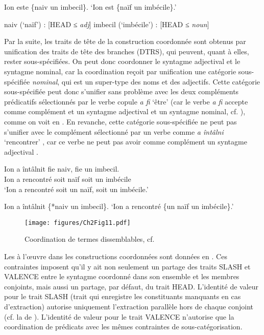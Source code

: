 \ex Ion este \{naiv {\textbar} un imbecil\}.
\glt ‘Ion est \{naïf {\textbar} un imbécile\}.’  
\z
\z


\ea \label{ch2:ex256}
\ea naiv (‘naïf’) : [HEAD  {\textbar}  ≤ \textit{adj}] \label{ch2:ex256a}
\ex imbecil (‘imbécile’) : [HEAD  {\textbar}  ≤ \textit{noun}] \label{ch2:ex256b}
\z
\z

Par la suite, les traits de tête de la construction coordonnée sont obtenus par unification des traits de tête des branches (DTRS), qui peuvent, quant à elles, rester sous-spécifiées. On peut donc coordonner le syntagme adjectival et le syntagme nominal, car la coordination reçoit par unification une catégorie sous-spécifiée \textit{nominal}, qui est un super-type des noms et des adjectifs. Cette catégorie sous-spécifiée peut donc s’unifier sans problème avec les deux compléments prédicatifs sélectionnés par le verbe copule \textit{a fi} ‘être’ (car le verbe \textit{a fi} accepte comme complément et un syntagme adjectival et un syntagme nominal, cf. ), comme on voit en . En revanche, cette catégorie sous-spécifiée ne peut pas s’unifier avec le complément sélectionné par un verbe comme \textit{a întâlni} ‘rencontrer’ , car ce verbe ne peut pas avoir comme complément un syntagme adjectival .  

\ea
\ea 
\gll *Ion  a  întâlnit  fie  naiv,  fie  un  imbecil. \label{ch2:ex257a}\\
Ion  a  rencontré  soit  naïf  soit  un  imbécile\\
\glt ‘Ion a rencontré soit un naïf, soit un imbécile.’

\ex Ion a întâlnit \{*naiv {\textbar} un imbecil\}. \label{ch2:ex257b}
\glt ‘Ion a rencontré \{un naïf {\textbar} un imbécile\}.’
\z
\z


\begin{figure} 

   \texttt{[image: figures/Ch2Fig11.pdf]}

\caption{Coordination de termes dissemblables, cf. }
\label{ch2:fig11}
\end{figure}

Les  à l’œuvre dans les constructions coordonnées sont données en . Ces contraintes imposent qu’il y ait non seulement un partage des traits SLASH et VALENCE entre le syntagme coordonné dans son ensemble et les membres conjoints, mais aussi un partage, par défaut, du trait HEAD. L’identité de valeur pour le trait SLASH (trait qui enregistre les constituants manquants en cas d’extraction) autorise uniquement l’extraction parallèle hors de chaque conjoint (cf. la  de \citealt{Ross1967}). L’identité de valeur pour le trait VALENCE n’autorise que la coordination de prédicats avec les mêmes contraintes de sous-catégorisation. 

